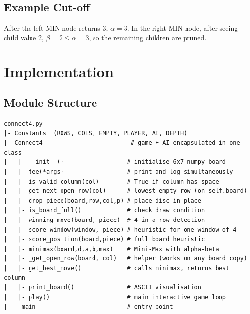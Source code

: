 \documentclass[12pt]{article}
\begin{document}
\subsection{Example Cut-off}

\begin{center}
\end{center}

After the left MIN-node returns 3, $\alpha = 3$.  In the right MIN-node,
after seeing child value 2, $\beta = 2 \leq \alpha = 3$, so the remaining
children are pruned.

\section{Implementation}

\subsection{Module Structure}

\begin{lstlisting}[caption={Module-level layout of connect4.py}]
connect4.py
|- Constants  (ROWS, COLS, EMPTY, PLAYER, AI, DEPTH)
|- Connect4                         # game + AI encapsulated in one class
|   |- __init__()                  # initialise 6x7 numpy board
|   |- tee(*args)                  # print and log simultaneously
|   |- is_valid_column(col)        # True if column has space
|   |- get_next_open_row(col)      # lowest empty row (on self.board)
|   |- drop_piece(board,row,col,p) # place disc in-place
|   |- is_board_full()             # check draw condition
|   |- winning_move(board, piece)  # 4-in-a-row detection
|   |- score_window(window, piece) # heuristic for one window of 4
|   |- score_position(board,piece) # full board heuristic
|   |- minimax(board,d,a,b,max)    # Mini-Max with alpha-beta
|   |- _get_open_row(board, col)   # helper (works on any board copy)
|   |- get_best_move()             # calls minimax, returns best column
|   |- print_board()               # ASCII visualisation
|   |- play()                      # main interactive game loop
|- __main__                        # entry point
\end{lstlisting}
\end{document}
